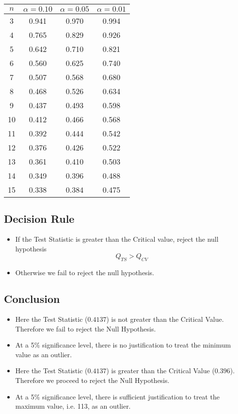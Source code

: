 \begin{center}
\begin{tabular}{|c|c|c|c|}
\hline
$n$	&	$\alpha=0.10$	&	$\alpha=0.05$	&	$\alpha=0.01$	\\ \hline
3	&	0.941	&	0.970	&	0.994	\\ \hline
4	&	0.765	&	0.829	&	0.926	\\ \hline
5	&	0.642	&	0.710	&	0.821	\\ \hline
6	&	0.560	&	0.625	&	0.740	\\ \hline
7	&	0.507	&	0.568	&	0.680	\\ \hline
8	&	0.468	&	0.526	&	0.634	\\ \hline
9	&	0.437	&	0.493	&	0.598	\\ \hline
10	&	0.412	&	0.466	&	0.568	\\ \hline
11	&	0.392	&	0.444	&	0.542	\\ \hline
12	&	0.376	&	0.426	&	0.522	\\ \hline
13	&	0.361	&	0.410	&	0.503	\\ \hline
14	&	0.349	&	0.396	&	0.488	\\ \hline
15	&	0.338	&	0.384	&	0.475	\\ \hline

\end{tabular} 
\end{center}

\subsection*{Decision Rule}


\begin{itemize}
    \item 
 If the Test Statistic is greater than the Critical value, reject the null hypothesis
\[ Q_{TS} > Q_{CV}\]

\item  Otherwise we fail to reject the null hypothesis.
\end{itemize}
\subsection*{Conclusion}

\begin{itemize}
\item Here the Test Statistic ($0.4137$) is not greater than the Critical Value. Therefore we fail to reject the Null Hypothesis. 

\item At a 5\% significance level, there is no justification to treat the minimum value as an outlier.

\item Here the Test Statistic ($0.4137$) is greater than the Critical Value ($0.396$). Therefore we proceed to reject the Null Hypothesis. 

\item At a 5\% significance level, there is sufficient justification to treat the maximum value, i.e. 113, as an outlier.
\end{itemize}



